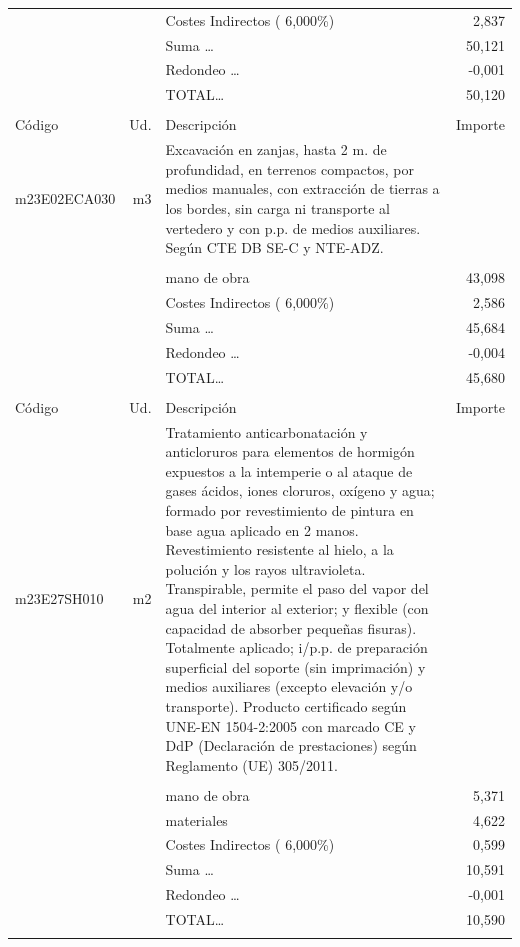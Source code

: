 \begin{supertabular}{l r p{60mm} r}
&&Costes Indirectos (     6,000\%)&     2,837\\%
&&Suma \ldots&    50,121\\%
&&Redondeo \ldots&    {-}0,001\\%
%
&&TOTAL\ldots&    50,120\\%
&&&\\%
Código&Ud.&Descripción&Importe\\%
\hline%
m23E02ECA030&m3&Excavación en zanjas, hasta 2 m. de profundidad, en terrenos compactos, por medios manuales, con extracción de tierras a los bordes, sin carga ni transporte al vertedero y con p.p. de medios auxiliares. Según CTE DB SE{-}C y NTE{-}ADZ.&\\%
&&&\\%
&&mano de obra&    43,098\\%
&&Costes Indirectos (     6,000\%)&     2,586\\%
&&Suma \ldots&    45,684\\%
&&Redondeo \ldots&    {-}0,004\\%
%
&&TOTAL\ldots&    45,680\\%
&&&\\%
Código&Ud.&Descripción&Importe\\%
\hline%
m23E27SH010&m2&Tratamiento anticarbonatación y anticloruros para elementos de hormigón expuestos a la intemperie o al ataque de gases ácidos, iones cloruros, oxígeno y agua; formado por revestimiento de pintura en base agua aplicado en 2 manos. Revestimiento resistente al hielo, a la polución y los rayos ultravioleta. Transpirable, permite el paso del vapor del agua del interior al exterior; y flexible (con capacidad de absorber pequeñas fisuras). Totalmente aplicado; i/p.p. de preparación superficial del soporte (sin imprimación) y medios auxiliares (excepto elevación y/o transporte). Producto certificado según UNE{-}EN 1504{-}2:2005 con marcado CE y DdP (Declaración de prestaciones) según Reglamento (UE) 305/2011.&\\%
&&&\\%
&&mano de obra&     5,371\\%
&&materiales&     4,622\\%
&&Costes Indirectos (     6,000\%)&     0,599\\%
&&Suma \ldots&    10,591\\%
&&Redondeo \ldots&    {-}0,001\\%
%
&&TOTAL\ldots&    10,590\\%
&&&\\%

\end{supertabular}
